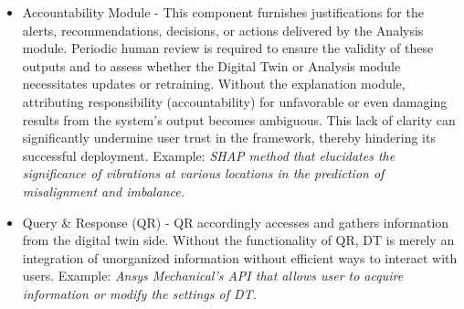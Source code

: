 \documentclass[runningheads]{llncs}
\begin{document}
\begin{itemize}
    \item Accountability Module - This component furnishes justifications for the alerts, recommendations, decisions, or actions delivered by the Analysis module. Periodic human review is required to ensure the validity of these outputs and to assess whether the Digital Twin or Analysis module necessitates updates or retraining. Without the explanation module, attributing responsibility (accountability) for unfavorable or even damaging results from the system's output becomes ambiguous. This lack of clarity can significantly undermine user trust in the framework, thereby hindering its successful deployment. Example: \textit{SHAP method that elucidates the significance of vibrations at various locations in the prediction of misalignment and imbalance.}
    \item Query \& Response (QR) - QR accordingly accesses and gathers information from the digital twin side. Without the functionality of QR, DT is merely an integration of unorganized information without efficient ways to interact with users. Example: \textit{Ansys Mechanical’s API that allows user to acquire information or modify the settings of DT.}
\end{itemize}
\end{document}
